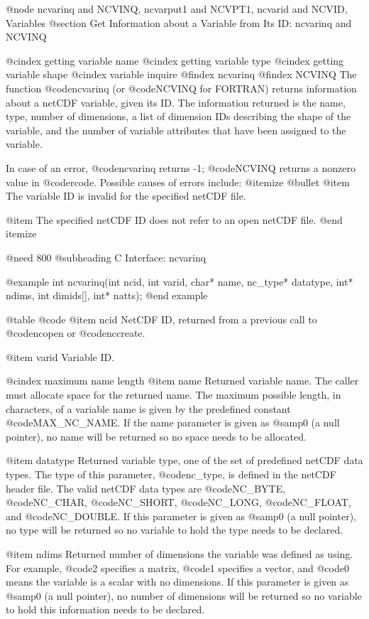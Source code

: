 @node ncvarinq and NCVINQ, ncvarput1 and NCVPT1, ncvarid and NCVID, Variables
@section Get Information about a Variable from Its ID:  ncvarinq and NCVINQ

@cindex getting variable name
@cindex getting variable type
@cindex getting variable shape
@cindex variable inquire
@findex ncvarinq
@findex NCVINQ
The function @code{ncvarinq} (or @code{NCVINQ} for FORTRAN) returns
information about a netCDF variable, given its ID.  The information
returned is the name, type, number of dimensions, a list of
dimension IDs describing the shape of the variable, and the number of
variable attributes that have been assigned to the variable.

In case of an error, @code{ncvarinq} returns -1; @code{NCVINQ} returns a
nonzero value in @code{rcode}.  Possible causes of errors include:
@itemize @bullet
@item
The variable ID is invalid for the specified netCDF file.

@item
The specified netCDF ID does not refer to an open netCDF file.
@end itemize

@need 800
@subheading C Interface:  ncvarinq

@example
int ncvarinq(int ncid, int varid, char* name, nc_type* datatype,
             int* ndims, int dimids[], int* natts);
@end example

@table @code
@item ncid
NetCDF ID, returned from a previous call to @code{ncopen} or @code{nccreate}.

@item varid
Variable ID.

@cindex maximum name length
@item name
Returned variable name.  The caller must allocate space for the
returned name.  The maximum possible length, in characters, of a
variable name is given by the predefined constant @code{MAX_NC_NAME}.
If the name parameter is given as @samp{0} (a null pointer), no name will be
returned so no space needs to be allocated.

@item datatype
Returned variable type, one of the set of predefined netCDF data types.
The type of this parameter, @code{nc_type}, is defined in the netCDF
header file.  The valid netCDF data types are @code{NC_BYTE},
@code{NC_CHAR}, @code{NC_SHORT}, @code{NC_LONG}, @code{NC_FLOAT}, and
@code{NC_DOUBLE}.  If this parameter is given as @samp{0} (a null pointer),
no type will be returned so no variable to hold the type needs to be
declared.

@item ndims
Returned number of dimensions the variable was defined as using.  For
example, @code{2} specifies a matrix, @code{1} specifies a vector, and
@code{0} means the variable is a scalar with no dimensions.  If this
parameter is given as @samp{0} (a null pointer), no number of dimensions will be
returned so no variable to hold this information needs to be declared.


